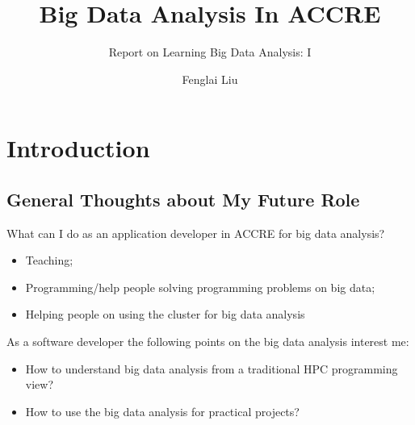 \documentclass[notheorems, aspectratio=54]{beamer}
\title[Big Data Analysis In ACCRE]{Big Data Analysis In ACCRE}
\subtitle{Report on Learning Big Data Analysis: I}
\author{Fenglai Liu}
\institute[ACCRE]{fenglai@accre.vanderbilt.edu}
\begin{document}
\begin{frame}
    \titlepage
\end{frame}

\section{Introduction}
\subsection{General Thoughts about My Future Role}
\begin{frame}

\begin{block}{What can I do as an application developer in ACCRE for big data analysis?}
\begin{itemize}
 \item Teaching;
 \item Programming/help people solving programming problems on big data;
 \item Helping people on using the cluster for big data analysis
\end{itemize}
\end{block}

 As a software developer the following points on the big data analysis interest me:
\begin{itemize}
 \item How to understand big data analysis from a traditional HPC programming view?
 \item How to use the big data analysis for practical projects?
\end{itemize}

\end{frame}

\end{document}
